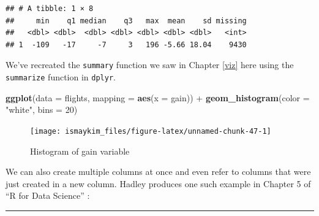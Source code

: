 \documentclass[]{tufte-book}
\newenvironment{Shaded}{\begin{snugshade}}{\end{snugshade}}
\newcommand{\KeywordTok}[1]{\textcolor[rgb]{0.13,0.29,0.53}{\textbf{{#1}}}}
\newcommand{\DataTypeTok}[1]{\textcolor[rgb]{0.13,0.29,0.53}{{#1}}}
\newcommand{\DecValTok}[1]{\textcolor[rgb]{0.00,0.00,0.81}{{#1}}}
\newcommand{\StringTok}[1]{\textcolor[rgb]{0.31,0.60,0.02}{{#1}}}
\newcommand{\NormalTok}[1]{{#1}}
\let\oldrule=\rule
\renewcommand{\rule}[1]{\oldrule{\linewidth}}
\begin{document}
\begin{verbatim}
## # A tibble: 1 × 8
##     min    q1 median    q3   max  mean    sd missing
##   <dbl> <dbl>  <dbl> <dbl> <dbl> <dbl> <dbl>   <int>
## 1  -109   -17     -7     3   196 -5.66 18.04    9430
\end{verbatim}

We've recreated the \texttt{summary} function we saw in Chapter
\ref{viz} here using the \texttt{summarize} function in \texttt{dplyr}.

\begin{Shaded}
\begin{Highlighting}[]
\KeywordTok{ggplot}\NormalTok{(}\DataTypeTok{data =} \NormalTok{flights, }\DataTypeTok{mapping =} \KeywordTok{aes}\NormalTok{(}\DataTypeTok{x =} \NormalTok{gain)) +}
\StringTok{  }\KeywordTok{geom_histogram}\NormalTok{(}\DataTypeTok{color =} \StringTok{"white"}\NormalTok{, }\DataTypeTok{bins =} \DecValTok{20}\NormalTok{)}
\end{Highlighting}
\end{Shaded}

\begin{figure}

{\centering \texttt{[image: ismaykim\_files/figure-latex/unnamed-chunk-47-1]} 

}

\caption[Histogram of gain variable]{Histogram of gain variable}\label{fig:unnamed-chunk-47}
\end{figure}

We can also create multiple columns at once and even refer to columns
that were just created in a new column. Hadley produces one such example
in Chapter 5 of ``R for Data Science'' \citep{rds2016}:

\begin{Shaded}
\end{Shaded}

\begin{center}\rule{0.5\linewidth}{\linethickness}\end{center}
\end{document}

